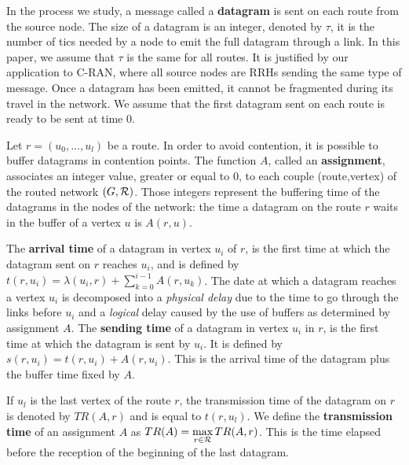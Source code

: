 \documentclass[english]{article}
\begin{document}
        In the process we study, a message called a {\bf datagram} is sent on each route from the source node. The size of a datagram is an integer, denoted by $\tau$, it is the number of tics needed by a node to emit the full datagram through a link.  In this paper, we assume that $\tau$ is the same for all routes. It is justified by our application to C-RAN, where all source nodes are RRHs sending the same type of message. Once a datagram has been emitted, it cannot be fragmented during its travel in the network. We assume that the first datagram sent on each route is ready to be sent at time $0$.

          Let $r=(u_0,\dots,u_l)$ be a route. In order to avoid contention, it is possible to buffer datagrams in contention points. The function $A$, called an \textbf{assignment}, associates an integer value, greater or equal to $0$, to each couple (route,vertex) of the routed network $(G,{\cal R})$. Those integers represent the buffering time of the datagrams in the nodes of the network: the time a datagram on the route $r$ waits in the buffer of a vertex $u$ is $A(r,u)$.
          
       

 The \textbf{arrival time} of a datagram in vertex $u_i$ of $r$, is the first time at which the datagram sent on $r$ reaches $u_i$, and is defined by $t(r,u_i) = \lambda(u_i,r) + \sum_{k=0}^{i-1} A(r,u_k) $. The date at which a datagram reaches a vertex $u_i$ is decomposed into a \emph{physical delay} due to the time to go through the links before $u_i$ and a \emph{logical} delay caused by the use of buffers as determined by assignment $A$.
  The \textbf{sending time} of a datagram in vertex $u_i$ in $r$, is the first time at which the datagram is sent by $u_i$. It is defined by $s(r,u_i) = t(r,u_i) +  A(r,u_i) $. This is the arrival time of the datagram plus the buffer time fixed by $A$.
 
  If $u_l$ is the last vertex of the route $r$, the transmission time of the datagram on 
  $r$ is denoted by $TR(A,r)$ and is equal to $t(r,u_l)$. We define the \textbf{transmission time} of an assignment $A$ as $TR(A) = \displaystyle \max\limits_{r \in {\cal R}} TR(A,r) $. This is the time elapsed before the reception of the beginning of the last datagram. 
         
\end{document}
